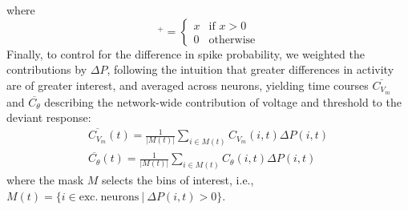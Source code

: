 \documentclass[9pt,lineno,onehalfspacing]{elife}
\begin{document}
where
\begin{equation*}
    [x]^+ =
    \begin{cases}
        x & \text{if $x > 0$}\\
        0 & \text{otherwise}
    \end{cases}
\end{equation*}
Finally, to control for the difference in spike probability, we weighted the contributions by $\Delta P$, following the intuition that greater differences in activity are of greater interest, and averaged across neurons, yielding time courses $\overline{C_{V_m}}$ and $\overline{C_\theta}$ describing the network-wide contribution of voltage and threshold to the deviant response:
\begin{align}
    \overline{C_{V_m}}(t) = \frac{1}{|M(t)|} \sum_{i \in M(t)} C_{V_m}(i,t) \Delta P(i,t) \nonumber \\
    \overline{C_\theta}(t) = \frac{1}{|M(t)|} \sum_{i \in M(t)} C_\theta(i,t) \Delta P(i,t) \label{eq:mean_contrib}
\end{align}
where the mask $M$ selects the bins of interest, i.e., $M(t) = \{i \in \mathrm{exc.~neurons} ~|~ \Delta P(i,t) > 0\}$.
\end{document}
